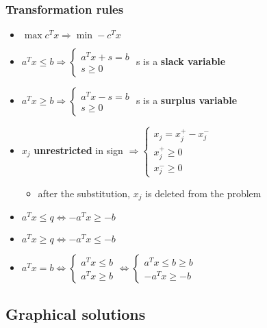 \documentclass[english]{article}
\begin{document}
\subsubsection{Transformation rules}

\begin{itemize}[parsep=1.25ex]
  \item \(\max c^T x \Rightarrow \min -c^T x\)
  \item \(a^T x \leq b \Rightarrow \begin{cases}
          a^T x + s = b \\
          s \geq 0
        \end{cases}\) s is a \textbf{slack variable}
  \item \(a^T x \geq b \Rightarrow \begin{cases}
          a^T x - s = b \\
          s \geq 0
        \end{cases}\) s is a \textbf{surplus variable}
  \item \(x_j\) \textbf{unrestricted} in sign \(\Rightarrow \begin{cases}
          x_j = x_j^+ - x_j^- \\
          x_j^+ \geq 0        \\
          x_j^- \geq 0
        \end{cases}\)
        \begin{itemize}[label=\(\rightarrow\)]
          \item after the substitution, \(x_j\) is deleted from the problem
        \end{itemize}
  \item \(a^T x \leq q \Leftrightarrow - a^T x \geq -b\)
  \item \(a^T x \geq q \Leftrightarrow - a^T x \leq -b\)
  \item \(a^T x = b \Leftrightarrow \begin{cases}
          a^T x \leq b \\
          a^T x \geq b
        \end{cases} \Leftrightarrow \begin{cases}
          a^T x \leq b \geq b \\
          -  a^T x \geq - b
        \end{cases}\)
\end{itemize}

\subsection{Graphical solutions}
\end{document}
